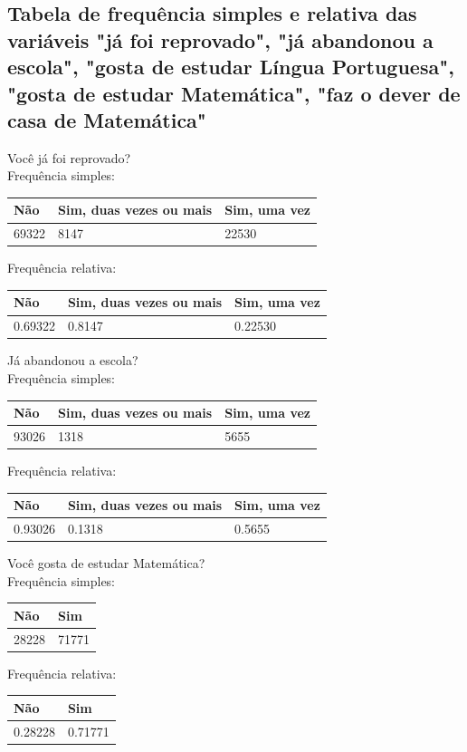 \documentclass[17pt]{extarticle}
\begin{document}
\newpage
\subsection{Tabela de frequência simples e relativa das variáveis "já foi reprovado", "já abandonou a escola", "gosta de estudar Língua Portuguesa", "gosta de estudar Matemática", "faz o dever de casa de Matemática"}
Você já foi reprovado? \\
Frequência simples:
\begin{table}[H]
\begin{tabular}{|l|l|l|}
\hline
Não   & Sim, duas vezes ou mais & Sim, uma vez \\ \hline
69322 & 8147                    & 22530        \\ \hline
\end{tabular}
\end{table}
\noindent
Frequência relativa:
\begin{table}[H]
\begin{tabular}{|l|l|l|}
\hline
Não   & Sim, duas vezes ou mais & Sim, uma vez \\ \hline
0.69322 & 0.8147                    & 0.22530        \\ \hline
\end{tabular}
\end{table}

\noindent
Já abandonou a escola? \\
Frequência simples:
\begin{table}[H]
\begin{tabular}{|l|l|l|}
\hline
Não   & Sim, duas vezes ou mais & Sim, uma vez \\ \hline
93026 & 1318                    & 5655        \\ \hline
\end{tabular}
\end{table}
\noindent
Frequência relativa:
\begin{table}[H]
\begin{tabular}{|l|l|l|}
\hline
Não   & Sim, duas vezes ou mais & Sim, uma vez \\ \hline
0.93026 & 0.1318                    & 0.5655        \\ \hline
\end{tabular}
\end{table}

\noindent
Você gosta de estudar Matemática? \\
Frequência simples:
\begin{table}[H]
\begin{tabular}{|l|l|}
\hline
Não   & Sim \\ \hline
28228 & 71771        \\ \hline
\end{tabular}
\end{table}
\noindent
Frequência relativa:
\begin{table}[H]
\begin{tabular}{|l|l|}
\hline
Não   & Sim \\ \hline
0.28228 & 0.71771        \\ \hline
\end{tabular}
\end{table}
\end{document}
